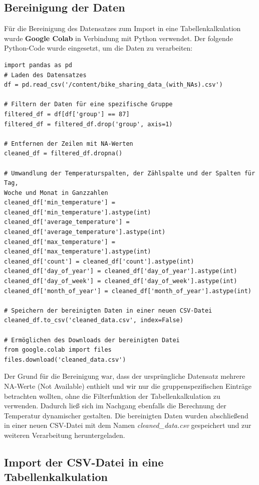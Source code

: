 \documentclass{article}
\begin{document}
\subsection{Bereinigung der Daten}

Für die Bereinigung des Datensatzes zum Import in eine Tabellenkalkulation wurde \textbf{Google Colab} in Verbindung mit Python verwendet. Der folgende Python-Code wurde eingesetzt, um die Daten zu verarbeiten:\\ 


\begin{verbatim}
import pandas as pd
# Laden des Datensatzes
df = pd.read_csv('/content/bike_sharing_data_(with_NAs).csv')

# Filtern der Daten für eine spezifische Gruppe
filtered_df = df[df['group'] == 87]
filtered_df = filtered_df.drop('group', axis=1)

# Entfernen der Zeilen mit NA-Werten
cleaned_df = filtered_df.dropna()

# Umwandlung der Temperaturspalten, der Zählspalte und der Spalten für Tag,
Woche und Monat in Ganzzahlen
cleaned_df['min_temperature'] = cleaned_df['min_temperature'].astype(int)
cleaned_df['average_temperature'] = cleaned_df['average_temperature'].astype(int)
cleaned_df['max_temperature'] = cleaned_df['max_temperature'].astype(int)
cleaned_df['count'] = cleaned_df['count'].astype(int)
cleaned_df['day_of_year'] = cleaned_df['day_of_year'].astype(int)
cleaned_df['day_of_week'] = cleaned_df['day_of_week'].astype(int)
cleaned_df['month_of_year'] = cleaned_df['month_of_year'].astype(int)

# Speichern der bereinigten Daten in einer neuen CSV-Datei
cleaned_df.to_csv('cleaned_data.csv', index=False)

# Ermöglichen des Downloads der bereinigten Datei
from google.colab import files
files.download('cleaned_data.csv')
\end{verbatim}


Der Grund für die Bereinigung war, dass der ursprüngliche Datensatz mehrere NA-Werte (Not Available) enthielt und wir nur die gruppenspezifischen Einträge betrachten wollten, ohne die Filterfunktion der Tabellenkalkulation zu verwenden. Dadurch ließ sich im Nachgang ebenfalls die Berechnung der Temperatur dynamischer gestalten. Die bereinigten Daten wurden abschließend in einer neuen CSV-Datei mit dem Namen \textit{cleaned\_data.csv} gespeichert und zur weiteren Verarbeitung heruntergeladen. 


\subsection{Import der CSV-Datei in eine Tabellenkalkulation}
\end{document}

